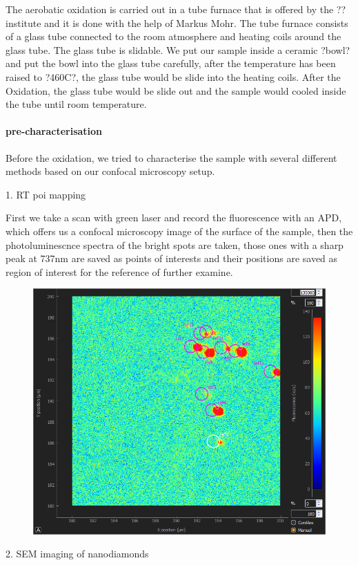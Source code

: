 The aerobatic oxidation is carried out in a tube furnace that is offered by the ?? institute and it is done with the help of Markus Mohr. The tube furnace consists of a glass tube connected to the room atmosphere and heating coils around the glass tube. The glass tube is slidable. We put our sample inside a ceramic ?bowl? and put the bowl into the glass tube carefully, after the temperature has been raised to ?460C?, the glass tube would be slide into the heating coils. After the Oxidation, the glass tube would be slide out and the sample would cooled inside the tube until room temperature.

\paragraph{pre-characterisation}
Before the oxidation, we tried to characterise the sample with several different methods based on our confocal microscopy setup.

1. RT poi mapping

First we take a scan with green laser and record the fluorescence with an APD, which offers us a confocal microscopy image of the surface of the sample, then the photoluminescnce spectra of the bright spots are taken, those ones with a sharp peak at 737nm are saved as points of interests and their positions are saved as region of interest for the reference of further examine.
\FloatBarrier
\begin{figure}[h]
\centering
\includegraphics[width=0.7\linewidth]{Figures/pic/2015-09-07-ow-capture-20150907151210-744-1}
\caption{}
\label{fig:2015-09-07-ow-capture-20150907151210-744-1}
\end{figure}

\FloatBarrier

2. SEM imaging of nanodiamonds



